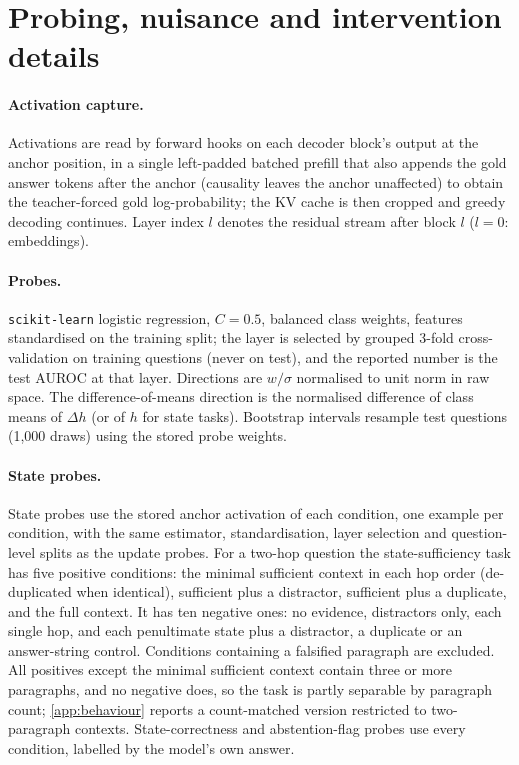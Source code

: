\section{Probing, nuisance and intervention details}
\label{app:probing}
\paragraph{Activation capture.} Activations are read by forward hooks on each decoder block's output at the anchor position, in a single left-padded batched prefill that also appends the gold answer tokens after the anchor (causality leaves the anchor unaffected) to obtain the teacher-forced gold log-probability; the KV cache is then cropped and greedy decoding continues. Layer index $l$ denotes the residual stream after block $l$ ($l=0$: embeddings).

\paragraph{Probes.} \texttt{scikit-learn} logistic regression, $C=0.5$, balanced class weights, features standardised on the training split; the layer is selected by grouped 3-fold cross-validation on training questions (never on test), and the reported number is the test AUROC at that layer. Directions are $w/\sigma$ normalised to unit norm in raw space. The difference-of-means direction is the normalised difference of class means of $\Delta h$ (or of $h$ for state tasks). Bootstrap intervals resample test questions (1{,}000 draws) using the stored probe weights.

\paragraph{State probes.} State probes use the stored anchor activation of each condition, one example per condition, with the same estimator, standardisation, layer selection and question-level splits as the update probes. For a two-hop question the state-sufficiency task has five positive conditions: the minimal sufficient context in each hop order (de-duplicated when identical), sufficient plus a distractor, sufficient plus a duplicate, and the full context. It has ten negative ones: no evidence, distractors only, each single hop, and each penultimate state plus a distractor, a duplicate or an answer-string control. Conditions containing a falsified paragraph are excluded. All positives except the minimal sufficient context contain three or more paragraphs, and no negative does, so the task is partly separable by paragraph count; \cref{app:behaviour} reports a count-matched version restricted to two-paragraph contexts. State-correctness and abstention-flag probes use every condition, labelled by the model's own answer.

